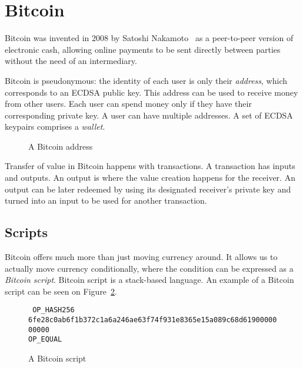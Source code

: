 \section{Bitcoin}
Bitcoin was invented in 2008 by Satoshi Nakamoto~\cite{bitcoin} as a peer-to-peer version of electronic cash, allowing online payments to be sent directly between parties without the need of an intermediary.

Bitcoin is pseudonymous: the identity of each user is only their \emph{address}, which corresponds to an ECDSA  public key. This address can be used to receive money from other users. Each user can spend money only if they have their corresponding private key. A user can have multiple addresses. A set of ECDSA keypairs comprises a \emph{wallet}.

\begin{figure}
  \centering
  \caption{A Bitcoin address}
  \label{fig:address-example}
\end{figure}

Transfer of value in Bitcoin happens with transactions. A transaction has inputs and outputs. An output is where the value creation happens for the receiver. An output can be later redeemed by using its designated receiver's private key and turned into an input to be used for another transaction.


\subsection{Scripts}
Bitcoin offers much more than just moving currency around. It allows us to actually move currency conditionally, where the condition can be expressed as a \emph{Bitcoin script}. Bitcoin script is a stack-based language. An example of a Bitcoin script can be seen on Figure~\ref{fig:bitcoin-script}.

\begin{figure}
  \centering
  {
    \tt
    OP\_HASH256 \\
    6fe28c0ab6f1b372c1a6a246ae63f74f931e8365e15a089c68d6190000000000 \\
    OP\_EQUAL
  }
  \caption{A Bitcoin script}
  \label{fig:bitcoin-script}
\end{figure}


